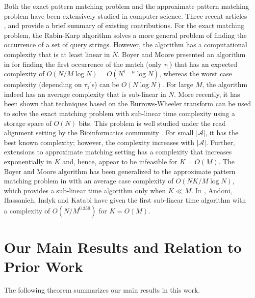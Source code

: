 Both the exact pattern matching problem and the approximate pattern matching problem have been extensively studied in computer science.
Three recent articles \cite{andoni2013shift}, \cite{amir2004faster} and \cite{navarro2001guided} provide a brief summary of existing contributions.
For the exact matching problem, the Rabin-Karp algorithm solves a more general problem of finding the occurrence of a set of query strings.
However, the algorithm has a computational complexity that is at least linear in $N$. Boyer and Moore presented an algorithm in \cite{boyer1977fast} for finding the first occurrence of the match (only $\tau_1$) that has an expected complexity of $O(N/M \log N) = O(N^{1-\mu} \log N)$, whereas the worst case complexity (depending on $\tau_1$'s) can be $O(N \log N)$. For large $M$, the algorithm indeed has an average complexity that is sub-linear in $N$. More recently, it has been shown that techniques based on the Burrows-Wheeler transform can be used to solve the exact matching problem with sub-linear time complexity \cite{ferragina2005indexing} using a storage space of $O(N)$ bits. This problem is well studied under the read alignment setting by the Bioinformatics community \cite{li2009fast,li2010fast}. For small $|\mathcal{A}|$, it has the best known complexity; however, the complexity increases with $|\mathcal{A}|$. Further, extensions to approximate matching setting \cite{zhang2003approximate} has a complexity that increases exponentially in $K$ and, hence, appear to be infeasible for $K = O(M)$. The Boyer and Moore algorithm has been generalized to the approximate pattern matching problem in \cite{chang1994approximate} with an average case complexity of $O(NK/M \log N)$, which provides a sub-linear time algorithm only when $K \ll M$. In \cite{andoni2013shift}, Andoni, Hassanieh, Indyk and Katabi have given the first sub-linear time algorithm with a complexity of $O(N/M^{0.359})$ for $K = O(M)$.

\section{Our Main Results and Relation to Prior Work}
\label{sec:mainresults}
The following theorem summarizes our main results in this work.


